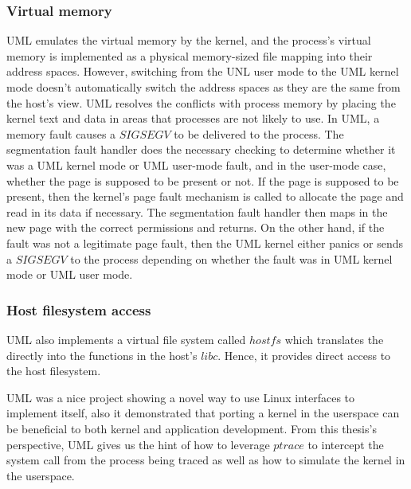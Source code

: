 \subsubsection{Virtual memory}

UML emulates the virtual memory by the kernel, and the process's virtual memory is implemented as a physical memory-sized file mapping into their address spaces. However, switching from the UNL user mode to the UML kernel mode doesn't automatically switch the address spaces as they are the same from the host's view. UML resolves the conflicts with process memory by placing the kernel text and data in areas that processes are not likely to use. In UML, a memory fault causes a $SIGSEGV$ to be delivered to the process. The segmentation fault handler does the necessary checking to determine whether it was a UML kernel mode or UML user-mode fault, and in the user-mode case, whether the page is supposed to be present or not. If the page is supposed to be present, then the kernel's page fault mechanism is called to allocate the page and read in its data if necessary. The segmentation fault handler then maps in the new page with the correct permissions and returns. On the other hand, if the fault was not a legitimate page fault, then the UML kernel either panics or sends a $SIGSEGV$ to the process depending on whether the fault was in UML kernel mode or UML user mode.  

\subsubsection{Host filesystem access}

UML also implements a virtual file system called $hostfs$ which translates the directly into the functions in the host's $libc$. Hence, it provides direct access to the host filesystem.

UML was a nice project showing a novel way to use Linux interfaces to implement itself, also it demonstrated that porting a kernel in the userspace can be beneficial to both kernel and application development. From this thesis's perspective, UML gives us the hint of how to leverage $ptrace$ to intercept the system call from the process being traced as well as how to simulate the kernel in the userspace.




